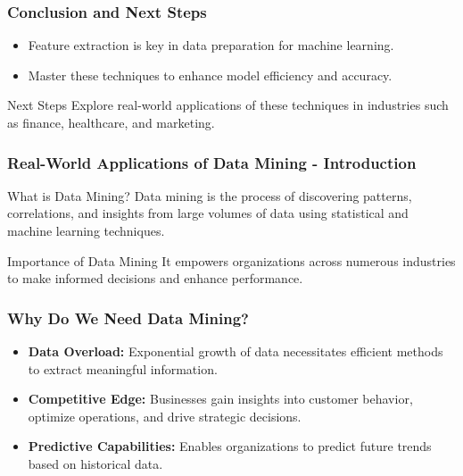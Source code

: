 \documentclass[aspectratio=169]{beamer}
\begin{document}
\begin{frame}[fragile]
    \frametitle{Conclusion and Next Steps}
    \begin{itemize}
        \item Feature extraction is key in data preparation for machine learning.
        \item Master these techniques to enhance model efficiency and accuracy.
    \end{itemize}
    \begin{block}{Next Steps}
        Explore real-world applications of these techniques in industries such as finance, healthcare, and marketing.
    \end{block}
\end{frame}

\begin{frame}[fragile]
    \frametitle{Real-World Applications of Data Mining - Introduction}
    \begin{block}{What is Data Mining?}
        Data mining is the process of discovering patterns, correlations, and insights from large volumes of data using statistical and machine learning techniques. 
    \end{block}
    \begin{block}{Importance of Data Mining}
        It empowers organizations across numerous industries to make informed decisions and enhance performance.
    \end{block}
\end{frame}

\begin{frame}[fragile]
    \frametitle{Why Do We Need Data Mining?}
    \begin{itemize}
        \item \textbf{Data Overload:} Exponential growth of data necessitates efficient methods to extract meaningful information.
        \item \textbf{Competitive Edge:} Businesses gain insights into customer behavior, optimize operations, and drive strategic decisions.
        \item \textbf{Predictive Capabilities:} Enables organizations to predict future trends based on historical data.
    \end{itemize}
\end{frame}
\end{document}
